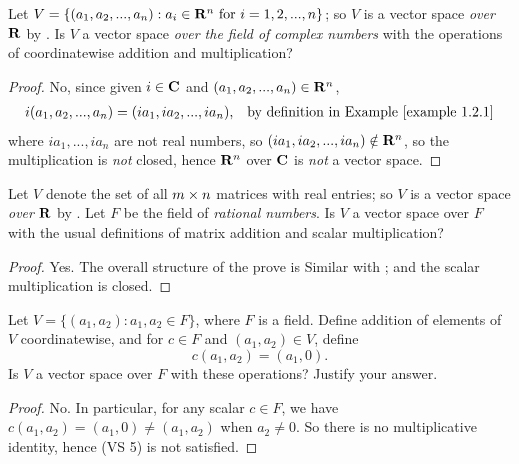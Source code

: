 \begin{exercise} \label{exercise 1.2.15}
Let \(V = \{ (a_1, a_2, ..., a_n): a_i \in \mathbf{R}^n \text{ for } i = 1, 2, ..., n \}\);
so \(V\) is a vector space \emph{over} \(\mathbf{R}\) by .
Is \(V\) a vector space \emph{over the field of complex numbers} with the operations of coordinatewise addition and
multiplication?
\end{exercise}

\begin{proof}
No, since given \(i \in \mathbf{C}\) and \((a_1, a_2, ..., a_n) \in \mathbf{R}^n\),
\begin{align*}
    i (a_1, a_2, ..., a_n) & = (i a_1, i a_2, ..., i a_n), & \text{by definition in \EXAMPLE{1.2.1}}
\end{align*}
where \(i a_1, ..., i a_n\) are not real numbers, so \((i a_1, i a_2, ..., i a_n) \notin \mathbf{R}^n\), so the multiplication is \emph{not} closed, hence \(\mathbf{R}^n\) over \(\mathbf{C}\) is \emph{not} a vector space.
\end{proof}

\begin{exercise} \label{exercise 1.2.16}
Let \(V\) denote the set of all \(m \times n\) matrices with real entries;
so \(V\) is a vector space \emph{over} \(\mathbf{R}\) by .
Let \(F\) be the field of \emph{rational numbers}.
Is \(V\) a vector space over \(F\) with the usual definitions of matrix addition and scalar multiplication?
\end{exercise}

\begin{proof}
Yes.
The overall structure of the prove is Similar with ;
and the scalar multiplication is closed.
\end{proof}

\begin{exercise} \label{exercise 1.2.17}
Let \(V = \{ (a_1, a_2) : a_1, a_2 \in F \}\), where \(F\) is a field.
Define addition of elements of \(V\) coordinatewise, and for \(c \in F\) and \((a_1, a_2) \in V\), define
\[
    c(a_1, a_2) = (a_1, 0).
\]
Is \(V\) a vector space over \(F\) with these operations? Justify your answer.
\end{exercise}

\begin{proof}
No.
In particular, for any scalar \(c \in F\), we have \(c(a_1, a_2) = (a_1, 0) \ne (a_1, a_2)\) when \(a_2 \ne 0\).
So there is no multiplicative identity, hence (VS 5) is not satisfied.
\end{proof}

